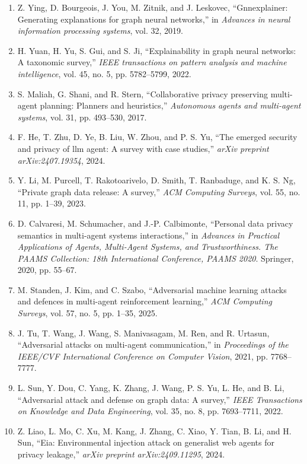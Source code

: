 \documentclass[10pt,UTF8,fontset=fandol]{ctexart}
\begin{document}
\begin{enumerate}[leftmargin=2.4em,labelsep=0.4em,itemsep=0.15em]
\item Z. Ying, D. Bourgeois, J. You, M. Zitnik, and J. Leskovec, ``Gnnexplainer: Generating explanations for graph neural networks,'' in \textit{Advances in neural information processing systems}, vol. 32, 2019.
\item H. Yuan, H. Yu, S. Gui, and S. Ji, ``Explainability in graph neural networks: A taxonomic survey,'' \textit{IEEE transactions on pattern analysis and machine intelligence}, vol. 45, no. 5, pp. 5782--5799, 2022.
\item S. Maliah, G. Shani, and R. Stern, ``Collaborative privacy preserving multi-agent planning: Planners and heuristics,'' \textit{Autonomous agents and multi-agent systems}, vol. 31, pp. 493--530, 2017.
\item F. He, T. Zhu, D. Ye, B. Liu, W. Zhou, and P. S. Yu, ``The emerged security and privacy of llm agent: A survey with case studies,'' \textit{arXiv preprint arXiv:2407.19354}, 2024.
\item Y. Li, M. Purcell, T. Rakotoarivelo, D. Smith, T. Ranbaduge, and K. S. Ng, ``Private graph data release: A survey,'' \textit{ACM Computing Surveys}, vol. 55, no. 11, pp. 1--39, 2023.
\item D. Calvaresi, M. Schumacher, and J.-P. Calbimonte, ``Personal data privacy semantics in multi-agent systems interactions,'' in \textit{Advances in Practical Applications of Agents, Multi-Agent Systems, and Trustworthiness. The PAAMS Collection: 18th International Conference, PAAMS 2020}. Springer, 2020, pp. 55--67.
\item M. Standen, J. Kim, and C. Szabo, ``Adversarial machine learning attacks and defences in multi-agent reinforcement learning,'' \textit{ACM Computing Surveys}, vol. 57, no. 5, pp. 1--35, 2025.
\item J. Tu, T. Wang, J. Wang, S. Manivasagam, M. Ren, and R. Urtasun, ``Adversarial attacks on multi-agent communication,'' in \textit{Proceedings of the IEEE/CVF International Conference on Computer Vision}, 2021, pp. 7768--7777.
\item L. Sun, Y. Dou, C. Yang, K. Zhang, J. Wang, P. S. Yu, L. He, and B. Li, ``Adversarial attack and defense on graph data: A survey,'' \textit{IEEE Transactions on Knowledge and Data Engineering}, vol. 35, no. 8, pp. 7693--7711, 2022.
\item Z. Liao, L. Mo, C. Xu, M. Kang, J. Zhang, C. Xiao, Y. Tian, B. Li, and H. Sun, ``Eia: Environmental injection attack on generalist web agents for privacy leakage,'' \textit{arXiv preprint arXiv:2409.11295}, 2024.

\end{enumerate}
\end{document}
